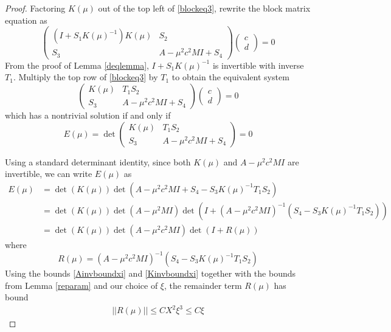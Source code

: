 \documentclass[thesis.tex]{subfiles}
\begin{document}
\begin{lemma}
\begin{proof}
Factoring $K(\mu)$ out of the top left of \cref{blockeq3}, rewrite the block matrix equation as
\begin{equation}\label{blockeq3}
\begin{pmatrix}
(I + S_1 K(\mu)^{-1})K(\mu) & S_2 \\
S_3 & A - \mu^2 c^2 MI + S_4
\end{pmatrix}
\begin{pmatrix} c \\ d \end{pmatrix} = 0
\end{equation}
From the proof of Lemma \ref{deqlemma}, $I + S_1 K(\mu)^{-1}$ is invertible with inverse $T_1$. Multiply the top row of \eqref{blockeq3} by $T_1$ to obtain the equivalent system
\begin{equation}\label{blockeq4}
\begin{pmatrix}
K(\mu) & T_1 S_2 \\
S_3 & A - \mu^2 c^2 MI + S_4
\end{pmatrix}
\begin{pmatrix} c \\ d \end{pmatrix} = 0
\end{equation}
which has a nontrivial solution if and only if
\begin{equation}\label{countdefE}
E(\mu) = \det 
\begin{pmatrix}
K(\mu) & T_1 S_2 \\
S_3 & A - \mu^2 c^2 MI + S_4
\end{pmatrix} = 0
\end{equation}

Using a standard determinant identity, since both $K(\mu)$ and $A - \mu^2 c^2 M I$ are invertible, we can write $E(\mu)$ as
\begin{align*}
E(\mu) &= \det(K(\mu))
\det ( A - \mu^2 c^2 MI + S_4 - S_3 K(\mu)^{-1}T_1 S_2 ) \\
&= \det(K(\mu))\det(A - \mu^2 MI)
\det ( I + (A - \mu^2 c^2 MI)^{-1}(S_4 - S_3 K(\mu)^{-1}T_1 S_2) ) \\
&= \det(K(\mu))\det(A - \mu^2 c^2 MI)\det(I + R(\mu))
\end{align*}
where
\[
R(\mu) = (A - \mu^2 c^2 MI)^{-1}(S_4 - S_3 K(
\mu)^{-1}T_1 S_2)
\]
Using the bounds \eqref{Ainvboundxi} and \eqref{Kinvboundxi} together with the bounds from Lemma \ref{reparam} and our choice of $\xi$, the remainder term $R(\mu)$ has bound
\begin{align*}
||R(\mu)|| \leq C X^2 \xi^3 \leq C \xi
\end{align*}


\end{proof}
\end{lemma}
\end{document}
